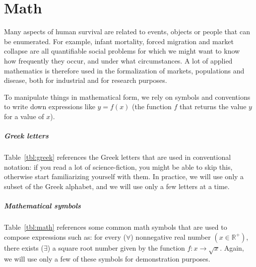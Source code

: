 %
%
\chapter{Math}%
  \label{ch:math}%




Many aspects of human survival are related to events, objects or people that can be enumerated. For example, infant mortality, forced migration and market collapse are all quantifiable social problems for which we might want to know how frequently they occur, and under what circumstances. A lot of applied mathematics is therefore used in the formalization of markets, populations and disease, both for industrial and for research purposes.

To manipulate things in mathematical form, we rely on symbols and conventions to write down expressions like $y = f(x)$ (the function $f$ that returns the value $y$ for a value of $x$).

%
\paragraph{Greek letters}%
%
Table~\ref{tbl:greek} references the Greek letters that are used in conventional notation: if you read a lot of science-fiction, you might be able to skip this, otherwise start familiarizing yourself with them. In practice, we will use only a subset of the Greek alphabet, and we will use only a few letters at a time.




%
\paragraph{Mathematical symbols}%
%
Table~\ref{tbl:math} references some common math symbols that are used to compose expressions such as: for every ($\forall$) nonnegative real number $(x \in \mathbb{R}^{+})$, there exists ($\exists$) a square root number given by the function $f: x \rightarrow \sqrt{x}$. Again, we will use only a few of these symbols for demonstration purposes.

